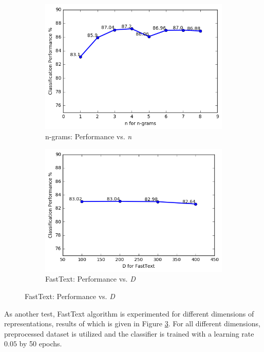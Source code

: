 \begin{figure}[h!]
	\centering
	\begin{subfigure}{0.48\columnwidth}
		\centering
		\includegraphics[width=\linewidth]{ngrams.png}
		\caption{n-grams: Performance vs. \textit{n}}
		\label{fig:perf_ngrams}
	\end{subfigure}
	\begin{subfigure}{0.48\columnwidth}
		\centering
		\includegraphics[width=\linewidth]{fasttext.png}
		\caption{FastText: Performance vs. \textit{D}}
		\label{fig:perf_ft}
	\end{subfigure}
\end{figure}


As another test, FastText algorithm is experimented for different dimensions of representations, results of which is given in Figure \ref{fig:perf_ft}.
For all different dimensions, preprocessed dataset is utilized and the classifier is trained with a learning rate $0.05$ by 50 epochs.

